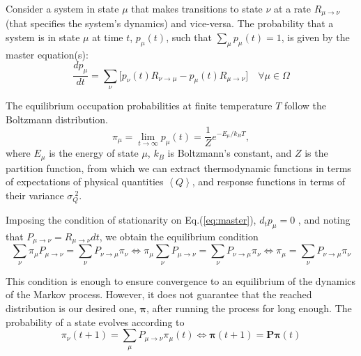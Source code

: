 Consider a system in state $\mu$ that makes transitions to state $\nu$ at a rate $R_{\mu \rightarrow  \nu}$ (that specifies the system's dynamics) and vice-versa.
The probability that a system is in state $\mu$ at time $t$, $p_\mu (t)$, such that $\sum_\mu p_\mu (t) = 1$, is given by the master equation(s):
\begin{equation}\label{eq:master}
\frac{d p_\mu}{dt} = \sum_\nu \big[ p_\nu (t) R_{\nu \rightarrow \mu} - p_\mu (t) R_{\mu \rightarrow \nu} \big] \quad \forall \mu \in \Omega
\end{equation}

The equilibrium occupation probabilities at finite temperature $T$ follow the Boltzmann distribution.
\begin{equation}
\pi_\mu = \lim_{t \rightarrow \infty} p_\mu (t) = \frac{1}{Z} e^{ - E_\mu / k_B T} ,
\end{equation}
where $E_\mu$ is the energy of state $\mu$, $k_B$ is Boltzmann's constant, and $Z$ is the partition function, from which we can extract thermodynamic functions in terms of expectations of physical quantities $\left\langle Q \right\rangle$, and response functions in terms of their variance $\sigma_Q^{\,\, 2}$.

Imposing the condition of stationarity on Eq.(\ref{eq:master}), $d_t p_\mu = 0$ , and noting that $ P_{\mu\rightarrow \nu} = R_{\mu\rightarrow \nu}  dt$, we obtain the equilibrium condition
\begin{equation}\label{eq:equilibrium}
\sum_\nu \pi_\mu P_{\mu \rightarrow \nu} = \sum_\nu P_{\nu \rightarrow \mu} \pi_\nu \iff \pi_\mu \sum_\nu P_{\mu \rightarrow \nu} = \sum_\nu P_{\nu \rightarrow \mu} \pi_\nu \iff \pi_\mu = \sum_\nu P_{\nu \rightarrow \mu} \pi_\nu
\end{equation}

This condition is enough to ensure convergence to an equilibrium of the dynamics of the Markov process.
However, it does not guarantee that the reached distribution is our desired one, $\bm \pi$, after running the process for long enough.
The probability of a state evolves according to
\begin{equation}
\pi_\nu ( t + 1 ) = \sum_\mu P_{\mu\rightarrow\nu}  \pi_\mu ( t ) \iff \bm \pi ( t + 1 ) = \bm P \bm \pi ( t )
\end{equation}

